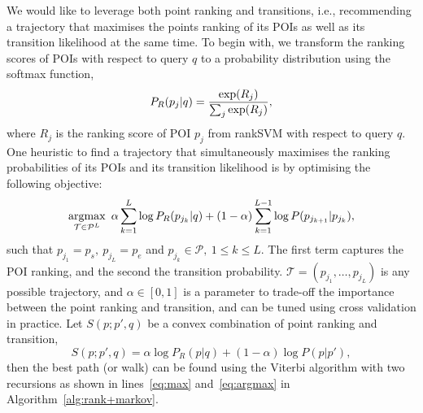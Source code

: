 We would like to leverage both point ranking and transitions,
i.e., recommending a trajectory that maximises the points ranking of its POIs as well as its transition likelihood at the same time.
To begin with, we transform the ranking scores of POIs with respect to query $q$
to a probability distribution using the softmax function,
\eqmoveup
\eqmoveup
\begin{equation}
\eqmoveup
\label{eq:rankprob}
P_R(p_j | q) = \frac{\exp(R_j)}{\sum_j \exp(R_j)},
\end{equation}
where $R_j$ is the ranking score of POI $p_j$ from rankSVM with respect to query $q$.
One heuristic to find a trajectory that simultaneously maximises the ranking probabilities of its POIs and its transition likelihood
is by optimising the following objective:
\eqmoveup
\begin{equation*}\eqmoveup
    \argmax_{\mathcal{T} \in \mathcal{P}^L} ~\alpha \sum_{k=1}^{L} \log P_R(p_{j_k} | q) +
                                     (1-\alpha) \sum_{k=1}^{L-1} \log P(p_{j_{k+1}} | p_{j_k}),
\end{equation*}
such that
$p_{j_1} = p_s, ~ p_{j_L} = p_e$ and
$p_{j_k} \in \mathcal{P}, ~1 \le k \le L$.
The first term captures the POI ranking, and the second the transition probability.
$\mathcal{T} = (p_{j_1}, \dots, p_{j_L})$ is any possible trajectory,
and $\alpha \in [0, 1]$ is a parameter to trade-off the importance between the point ranking and transition,
and can be tuned using cross validation in practice.
Let $S(p; p', q)$ be a convex combination of point ranking and transition,
\eqmoveup
\begin{equation}\label{eq:combined-score}
    S(p; p', q)  = \alpha \log P_R(p|q) + (1-\alpha) \log P(p|p'),
\end{equation}
then the best path (or walk) can be found using the Viterbi algorithm with two recursions
as shown in lines~\ref{eq:max} and~\ref{eq:argmax} in Algorithm~\ref{alg:rank+markov}.
